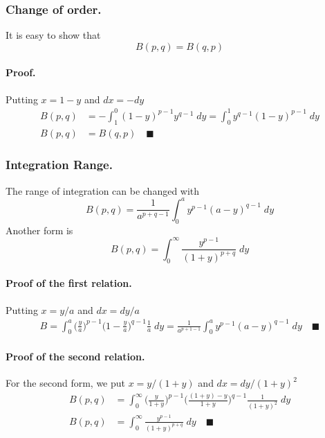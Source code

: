 \documentclass[../../main.tex]{subfiles}
\begin{document}
\subsubsection*{Change of order.} It is easy to show that
\begin{equation*}
    B(p,q)=B(q,p)
\end{equation*}

\paragraph{Proof.} Putting $x=1-y$ and $dx=-dy$
\begin{align*}
    B(p,q)&=-\int_{1}^{0}(1-y)^{p-1}y^{q-1}\;dy= \int_{0 }^{1}y^{q-1}(1-y)^{p-1}\;dy\\
    B(p,q)&=B(q,p)\quad\blacksquare
\end{align*}

\subsubsection*{Integration Range.} The range of integration can be changed with 
\begin{equation*}
    B(p,q)=\frac{1}{a^{p+q-1}}  \int_{0}^{a} y^{p-1}(a-y)^{q-1}\;dy 
\end{equation*}
Another form is
\begin{equation*}
    B(p,q)=\int_{0}^{\infty}\frac{y^{p-1}}{(1+y)^{p+q}}\;dy
\end{equation*}

\paragraph{Proof of the first relation.} Putting $x = y/a$ and $dx=dy/a$
\begin{align*}
    B=\int_{0}^{a}\big(\frac{y}{a}\big)^{p-1}\big(1-\frac{y}{a}\big)^{q-1}\frac{1}{a}\;dy=\frac{1}{a^{p+1-1}}  \int_{0}^{a} y^{p-1}(a-y)^{q-1}\;dy \quad\blacksquare
\end{align*}

\paragraph{Proof of the second relation.} For the second form, we put $x = y/(1 + y)$ and $dx=dy/(1+y)^2$
\begin{align*}
    B(p,q)&=\int_{0}^{\infty}\bigg(\frac{y}{1+y} \bigg)^{p-1} \bigg(\frac{(1+y)-y}{1+y}\bigg)^{q-1}\frac{1}{(1+y)^2}\;dy\\
    B(p,q)&=\int_{0}^{\infty}\frac{y^{p-1}}{(1+y)^{p+q}}\;dy\quad\blacksquare
\end{align*}
\end{document}
